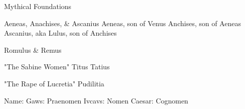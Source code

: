 Mythical Foundations

Aeneas, Anachises, & Ascanius
Aeneas, son of Venus
Anchises, son of Aeneas
Ascanius, aka Lulus, son of Anchises

Romulus & Remus

"The Sabine Women"
Titus Tatius

"The Rape of Lucretia"
Pudilitia

Name: 
Gaws: Praenomen
Ivcavs: Nomen
Caesar: Cognomen